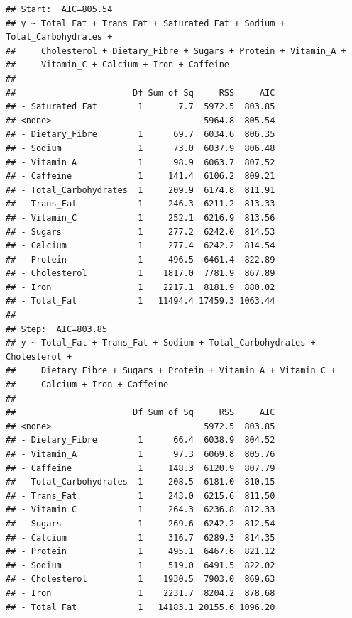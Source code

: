 \documentclass[
]{article}
\begin{document}
\begin{verbatim}
## Start:  AIC=805.54
## y ~ Total_Fat + Trans_Fat + Saturated_Fat + Sodium + Total_Carbohydrates + 
##     Cholesterol + Dietary_Fibre + Sugars + Protein + Vitamin_A + 
##     Vitamin_C + Calcium + Iron + Caffeine
## 
##                       Df Sum of Sq     RSS     AIC
## - Saturated_Fat        1       7.7  5972.5  803.85
## <none>                              5964.8  805.54
## - Dietary_Fibre        1      69.7  6034.6  806.35
## - Sodium               1      73.0  6037.9  806.48
## - Vitamin_A            1      98.9  6063.7  807.52
## - Caffeine             1     141.4  6106.2  809.21
## - Total_Carbohydrates  1     209.9  6174.8  811.91
## - Trans_Fat            1     246.3  6211.2  813.33
## - Vitamin_C            1     252.1  6216.9  813.56
## - Sugars               1     277.2  6242.0  814.53
## - Calcium              1     277.4  6242.2  814.54
## - Protein              1     496.5  6461.4  822.89
## - Cholesterol          1    1817.0  7781.9  867.89
## - Iron                 1    2217.1  8181.9  880.02
## - Total_Fat            1   11494.4 17459.3 1063.44
## 
## Step:  AIC=803.85
## y ~ Total_Fat + Trans_Fat + Sodium + Total_Carbohydrates + Cholesterol + 
##     Dietary_Fibre + Sugars + Protein + Vitamin_A + Vitamin_C + 
##     Calcium + Iron + Caffeine
## 
##                       Df Sum of Sq     RSS     AIC
## <none>                              5972.5  803.85
## - Dietary_Fibre        1      66.4  6038.9  804.52
## - Vitamin_A            1      97.3  6069.8  805.76
## - Caffeine             1     148.3  6120.9  807.79
## - Total_Carbohydrates  1     208.5  6181.0  810.15
## - Trans_Fat            1     243.0  6215.6  811.50
## - Vitamin_C            1     264.3  6236.8  812.33
## - Sugars               1     269.6  6242.2  812.54
## - Calcium              1     316.7  6289.3  814.35
## - Protein              1     495.1  6467.6  821.12
## - Sodium               1     519.0  6491.5  822.02
## - Cholesterol          1    1930.5  7903.0  869.63
## - Iron                 1    2231.7  8204.2  878.68
## - Total_Fat            1   14183.1 20155.6 1096.20
\end{verbatim}
\end{document}
